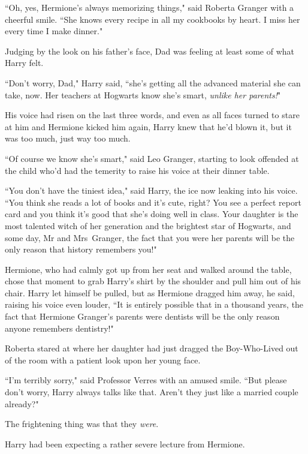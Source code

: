 ``Oh, yes, Hermione's always memorizing things," said Roberta Granger with a cheerful smile. ``She knows every recipe in all my cookbooks by heart. I miss her every time I make dinner."

Judging by the look on his father's face, Dad was feeling at least some of what Harry felt.

``Don't worry, Dad," Harry said, ``she's getting all the advanced material she can take, now. Her teachers at Hogwarts know she's smart, \emph{unlike her parents!}"

His voice had risen on the last three words, and even as all faces turned to stare at him and Hermione kicked him again, Harry knew that he'd blown it, but it was too much, just way too much.

``Of course we know she's smart," said Leo Granger, starting to look offended at the child who'd had the temerity to raise his voice at their dinner table.

``You don't have the tiniest idea," said Harry, the ice now leaking into his voice. ``You think she reads a lot of books and it's cute, right? You see a perfect report card and you think it's good that she's doing well in class. Your daughter is the most talented witch of her generation and the brightest star of Hogwarts, and some day, Mr and Mrs~Granger, the fact that you were her parents will be the only reason that history remembers you!"

Hermione, who had calmly got up from her seat and walked around the table, chose that moment to grab Harry's shirt by the shoulder and pull him out of his chair. Harry let himself be pulled, but as Hermione dragged him away, he said, raising his voice even louder, ``It is entirely possible that in a thousand years, the fact that Hermione Granger's parents were dentists will be the only reason anyone remembers dentistry!"

\later

Roberta stared at where her daughter had just dragged the Boy-Who-Lived out of the room with a patient look upon her young face.

``I'm terribly sorry," said Professor Verres with an amused smile. ``But please don't worry, Harry always talks like that. Aren't they just like a married couple already?"

The frightening thing was that they \emph{were}.

\later

Harry had been expecting a rather severe lecture from Hermione.

